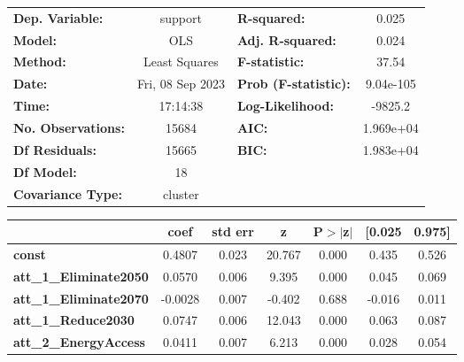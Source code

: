 \begin{center}
\begin{tabular}{lclc}
\toprule
\textbf{Dep. Variable:}              &     support      & \textbf{  R-squared:         } &     0.025   \\
\textbf{Model:}                      &       OLS        & \textbf{  Adj. R-squared:    } &     0.024   \\
\textbf{Method:}                     &  Least Squares   & \textbf{  F-statistic:       } &     37.54   \\
\textbf{Date:}                       & Fri, 08 Sep 2023 & \textbf{  Prob (F-statistic):} & 9.04e-105   \\
\textbf{Time:}                       &     17:14:38     & \textbf{  Log-Likelihood:    } &   -9825.2   \\
\textbf{No. Observations:}           &       15684      & \textbf{  AIC:               } & 1.969e+04   \\
\textbf{Df Residuals:}               &       15665      & \textbf{  BIC:               } & 1.983e+04   \\
\textbf{Df Model:}                   &          18      & \textbf{                     } &             \\
\textbf{Covariance Type:}            &     cluster      & \textbf{                     } &             \\
\bottomrule
\end{tabular}
\begin{tabular}{lcccccc}
                                     & \textbf{coef} & \textbf{std err} & \textbf{z} & \textbf{P$> |$z$|$} & \textbf{[0.025} & \textbf{0.975]}  \\
\midrule
\textbf{const}                       &       0.4807  &        0.023     &    20.767  &         0.000        &        0.435    &        0.526     \\
\textbf{att\_1\_Eliminate2050}       &       0.0570  &        0.006     &     9.395  &         0.000        &        0.045    &        0.069     \\
\textbf{att\_1\_Eliminate2070}       &      -0.0028  &        0.007     &    -0.402  &         0.688        &       -0.016    &        0.011     \\
\textbf{att\_1\_Reduce2030}          &       0.0747  &        0.006     &    12.043  &         0.000        &        0.063    &        0.087     \\
\textbf{att\_2\_EnergyAccess}        &       0.0411  &        0.007     &     6.213  &         0.000        &        0.028    &        0.054     \\

\end{tabular}
\end{center}
